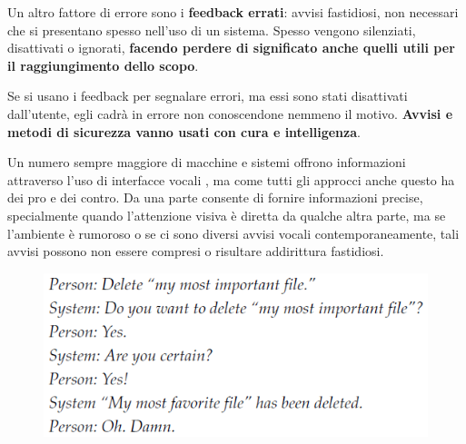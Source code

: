 \documentclass[a4paper,11pt,oneside]{book}
\begin{document}
Un altro fattore di errore sono i \textbf{feedback errati}: avvisi fastidiosi, non necessari che si presentano spesso nell'uso di un sistema. Spesso vengono silenziati, disattivati o ignorati, \textbf{facendo perdere di significato anche quelli utili per il raggiungimento dello scopo}.

Se si usano i feedback per segnalare errori, ma essi sono stati disattivati dall'utente, egli cadrà in errore non conoscendone nemmeno il motivo. \textbf{Avvisi e metodi di sicurezza vanno usati con cura e intelligenza}.

Un numero sempre maggiore di macchine e sistemi offrono informazioni attraverso l'uso di interfacce vocali , ma come tutti gli approcci anche questo ha dei pro e
dei contro. Da una parte consente di fornire informazioni precise, specialmente quando
l'attenzione visiva è diretta da qualche altra parte, ma se l'ambiente è rumoroso o se ci sono diversi avvisi vocali contemporaneamente, tali avvisi possono non essere compresi o risultare addirittura fastidiosi.

\pagebreak

\begin{figure}[!h]
	\centering
	\includegraphics[scale=0.6]{immagini/Damn.png}
\end{figure}
\end{document}
